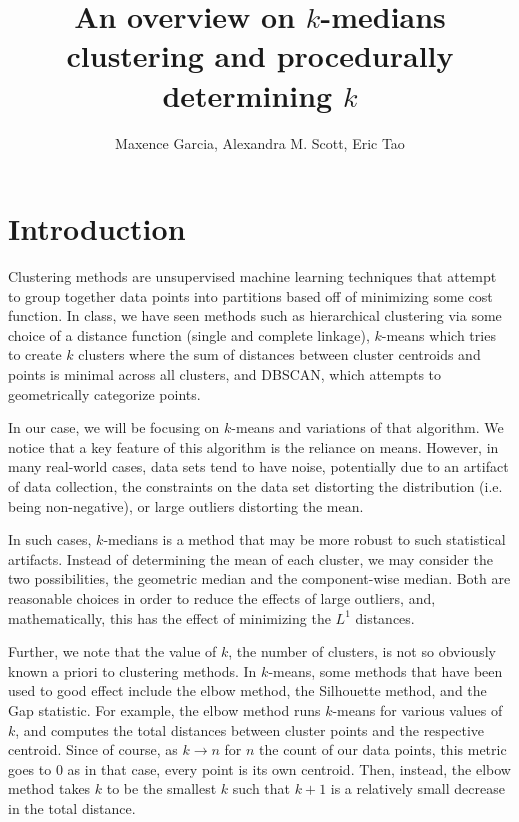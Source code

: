 \documentclass[sn-mathphys,Numbered]{sn-jnl}
\begin{document}
\title{An overview on $k$-medians clustering and procedurally determining $k$}

\author{Maxence Garcia, Alexandra M. Scott, Eric Tao}


\maketitle

\section{Introduction}

Clustering methods are unsupervised machine learning techniques that attempt to group together data points into partitions based off of minimizing some cost function. In class, we have seen methods such as hierarchical clustering via some choice of a distance function (single and complete linkage), $k$-means which tries to create $k$ clusters where the sum of distances between cluster centroids and points is minimal across all clusters, and DBSCAN, which attempts to geometrically categorize points.

In our case, we will be focusing on $k$-means and variations of that algorithm. We notice that a key feature of this algorithm is the reliance on means. However, in many real-world cases, data sets tend to have noise, potentially due to an artifact of data collection, the constraints on the data set distorting the distribution (i.e. being non-negative), or large outliers distorting the mean. 

In such cases, $k$-medians is a method that may be more robust to such statistical artifacts. Instead of determining the mean of each cluster, we may consider the two possibilities, the geometric median and the component-wise median. Both are reasonable choices in order to reduce the effects of large outliers, and, mathematically, this has the effect of minimizing the $L^1$ distances.

Further, we note that the value of $k$, the number of clusters, is not so obviously known a priori to clustering methods. In $k$-means, some methods that have been used to good effect include the elbow method, the Silhouette method, and the Gap statistic. For example, the elbow method runs $k$-means for various values of $k$, and computes the total distances between cluster points and the respective centroid. Since of course, as $k \to n$ for $n$ the count of our data points, this metric goes to $0$ as in that case, every point is its own centroid. Then, instead, the elbow method takes $k$ to be the smallest $k$ such that $k+1$ is a relatively small decrease in the total distance. 
\end{document}
